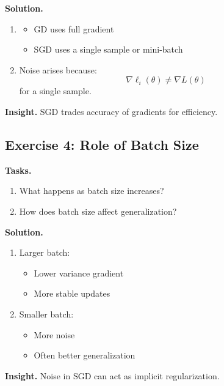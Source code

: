 \medskip

\noindent
\textbf{Solution.}

\begin{enumerate}
\item 
\begin{itemize}
    \item GD uses full gradient
    \item SGD uses a single sample or mini-batch
\end{itemize}

\item Noise arises because:
\[
\nabla \ell_i(\theta) \neq \nabla L(\theta)
\]
for a single sample.
\end{enumerate}

\medskip

\noindent
\textbf{Insight.}  
SGD trades accuracy of gradients for efficiency.

\subsection{Exercise 4: Role of Batch Size}

\textbf{Tasks.}
\begin{enumerate}
    \item What happens as batch size increases?
    \item How does batch size affect generalization?
\end{enumerate}

\medskip

\noindent
\textbf{Solution.}

\begin{enumerate}
\item Larger batch:
\begin{itemize}
    \item Lower variance gradient
    \item More stable updates
\end{itemize}

\item Smaller batch:
\begin{itemize}
    \item More noise
    \item Often better generalization
\end{itemize}
\end{enumerate}

\medskip

\noindent
\textbf{Insight.}  
Noise in SGD can act as implicit regularization.

